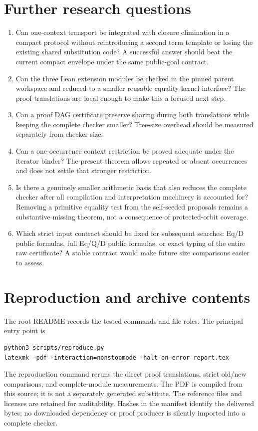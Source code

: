 \documentclass[11pt,letterpaper]{article}
\theoremstyle{definition}\newtheorem{definition}[theorem]{Definition}
\theoremstyle{remark}\newtheorem{remark}[theorem]{Remark}
\begin{document}
\section{Further research questions}
\begin{enumerate}
\item Can one-context transport be integrated with closure elimination in
  a compact protocol without reintroducing a second term template or
  losing the existing shared substitution code? A successful answer should
  beat the current compact envelope under the same public-goal contract.
\item Can the three Lean extension modules be checked in the pinned parent
  workspace and reduced to a smaller reusable equality-kernel interface?
  The proof translations are local enough to make this a focused next step.
\item Can a proof DAG certificate preserve sharing during both
  translations while keeping the complete checker smaller? Tree-size
  overhead should be measured separately from checker size.
\item Can a one-occurrence context restriction be proved adequate under
  the iterator binder? The present theorem allows repeated or absent
  occurrences and does not settle that stronger restriction.
\item Is there a genuinely smaller arithmetic basis that also reduces
  the complete checker after all compilation and interpretation machinery
  is accounted for? Removing a primitive equality test from the
  self-seeded proposals remains a substantive missing theorem, not a
  consequence of protected-orbit coverage.
\item Which strict input contract should be fixed for subsequent searches:
  Eq/D public formulas, full Eq/Q/D public formulas, or exact typing of
  the entire raw certificate? A stable contract would make future size
  comparisons easier to assess.
\end{enumerate}

\appendix
\section{Reproduction and archive contents}
The root README records the tested commands and file roles. The principal
entry point is
\begin{lstlisting}[language={}]
python3 scripts/reproduce.py
latexmk -pdf -interaction=nonstopmode -halt-on-error report.tex
\end{lstlisting}
The reproduction command reruns the direct proof translations, strict
old/new comparisons, and complete-module measurements. The PDF is compiled
from this source; it is not a separately generated substitute. The reference
files and licenses are retained for auditability. Hashes in the manifest
identify the delivered bytes; no downloaded dependency or proof producer
is silently imported into a complete checker.
\end{document}
